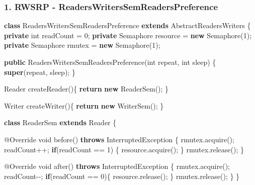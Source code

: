 \documentclass[
]{article}
\newenvironment{Shaded}{\begin{snugshade}}{\end{snugshade}}
\newcommand{\AttributeTok}[1]{\textcolor[rgb]{0.77,0.63,0.00}{#1}}
\newcommand{\BuiltInTok}[1]{#1}
\newcommand{\DataTypeTok}[1]{\textcolor[rgb]{0.13,0.29,0.53}{#1}}
\newcommand{\DecValTok}[1]{\textcolor[rgb]{0.00,0.00,0.81}{#1}}
\newcommand{\FunctionTok}[1]{\textcolor[rgb]{0.00,0.00,0.00}{#1}}
\newcommand{\KeywordTok}[1]{\textcolor[rgb]{0.13,0.29,0.53}{\textbf{#1}}}
\newcommand{\NormalTok}[1]{#1}
\begin{document}
\hypertarget{rwsrp---readerswriterssemreaderspreference}{%
\subsubsection{1. RWSRP -
ReadersWritersSemReadersPreference}\label{rwsrp---readerswriterssemreaderspreference}}

\begin{Shaded}
\begin{Highlighting}[]
\KeywordTok{class}\NormalTok{ ReadersWritersSemReadersPreference }\KeywordTok{extends}\NormalTok{ AbstractReadersWriters}
\NormalTok{\{}
    \KeywordTok{private} \DataTypeTok{int}\NormalTok{ readCount = }\DecValTok{0}\NormalTok{;}
    \KeywordTok{private} \BuiltInTok{Semaphore}\NormalTok{ resource = }\KeywordTok{new} \BuiltInTok{Semaphore}\NormalTok{(}\DecValTok{1}\NormalTok{);}
    \KeywordTok{private} \BuiltInTok{Semaphore}\NormalTok{ rmutex = }\KeywordTok{new} \BuiltInTok{Semaphore}\NormalTok{(}\DecValTok{1}\NormalTok{);}

    \KeywordTok{public} \FunctionTok{ReadersWritersSemReadersPreference}\NormalTok{(}\DataTypeTok{int}\NormalTok{ repeat, }\DataTypeTok{int}\NormalTok{ sleep) \{}
        \KeywordTok{super}\NormalTok{(repeat, sleep);}
\NormalTok{    \}}

    \BuiltInTok{Reader} \FunctionTok{createReader}\NormalTok{()\{}
        \KeywordTok{return} \KeywordTok{new} \FunctionTok{ReaderSem}\NormalTok{();}
\NormalTok{    \}}

    \BuiltInTok{Writer} \FunctionTok{createWriter}\NormalTok{()\{}
        \KeywordTok{return} \KeywordTok{new} \FunctionTok{WriterSem}\NormalTok{();}
\NormalTok{    \}}

    \KeywordTok{class}\NormalTok{ ReaderSem }\KeywordTok{extends} \BuiltInTok{Reader}\NormalTok{ \{}

        \AttributeTok{@Override}
        \DataTypeTok{void} \FunctionTok{before}\NormalTok{() }\KeywordTok{throws} \BuiltInTok{InterruptedException}\NormalTok{ \{}
\NormalTok{            rmutex.}\FunctionTok{acquire}\NormalTok{();}
\NormalTok{            readCount++;}
            \KeywordTok{if}\NormalTok{(readCount == }\DecValTok{1}\NormalTok{) \{}
\NormalTok{                resource.}\FunctionTok{acquire}\NormalTok{();}
\NormalTok{            \}}
\NormalTok{            rmutex.}\FunctionTok{release}\NormalTok{();}
\NormalTok{        \}}

        \AttributeTok{@Override}
        \DataTypeTok{void} \FunctionTok{after}\NormalTok{() }\KeywordTok{throws} \BuiltInTok{InterruptedException}\NormalTok{ \{}
\NormalTok{            rmutex.}\FunctionTok{acquire}\NormalTok{();}
\NormalTok{            readCount{-}{-};}
            \KeywordTok{if}\NormalTok{(readCount == }\DecValTok{0}\NormalTok{)\{}
\NormalTok{                resource.}\FunctionTok{release}\NormalTok{();}
\NormalTok{            \}}
\NormalTok{            rmutex.}\FunctionTok{release}\NormalTok{();}
\NormalTok{        \}}
\NormalTok{    \}}


\end{Highlighting}
\end{Shaded}
\end{document}
